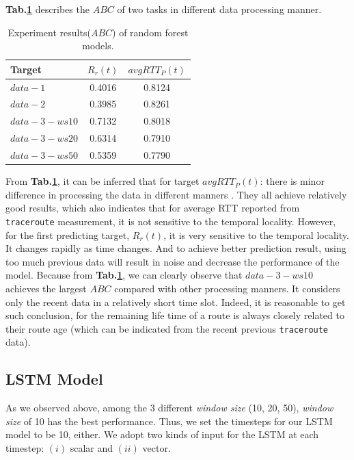\documentclass[sigconf]{acmart}
\begin{document}
	\textbf{Tab.\ref{tab:result_RF}} describes the $ABC$ of two tasks in different data processing manner.
	\begin{table}[tbp]
		\centering  
		\begin{tabular}{lcc} 
			\hline
			Target &$R_r(t)$ &$avgRTT_P(t)$ \\ \hline
			$data-1$ & 0.4016    &0.8124   \\        
			$data-2$ &0.3985 &0.8261 \\        
			$data-3-ws10$  &0.7132 &0.8018 \\
			$data-3-ws20$ &0.6314 &0.7910 \\
			$data-3-ws50$ &0.5359  &0.7790 \\ \hline
		\end{tabular}
		\caption{Experiment results($ABC$) of random forest models. }
		\label{tab:result_RF}
	\end{table}
	From \textbf{Tab.\ref{tab:result_RF}}, it can be inferred that for target $avgRTT_P(t)$: there is minor difference in processing the data in different manners . They all achieve relatively good results, which also indicates that for average RTT reported from \texttt{traceroute} measurement, it is not sensitive to the temporal locality. However, for the first predicting target, $R_r(t)$, it is very sensitive to the temporal locality. It changes rapidly as time changes. And to achieve better prediction result, using too much previous data will result in noise and decrease the performance of the model. Because from \textbf{Tab.\ref{tab:result_RF}}, we can clearly observe that $data-3-ws10$ achieves the largest $ABC$ compared with other processing manners. It considers only the recent data in a relatively short time slot. Indeed, it is reasonable to get such conclusion, for the remaining life time of a route is always closely related to their route age (which can be indicated from the recent previous \texttt{traceroute} data).
	\subsection{LSTM Model}
	
	As we observed above, among the 3 different \textit{window size} (10, 20, 50), \textit{window size} of 10 has the best performance. Thus, we set the timesteps for our LSTM model to be 10, either.  We adopt two kinds of input for the LSTM at each timestep: $(i)$ scalar and $(ii)$ vector.
	
\end{document}
